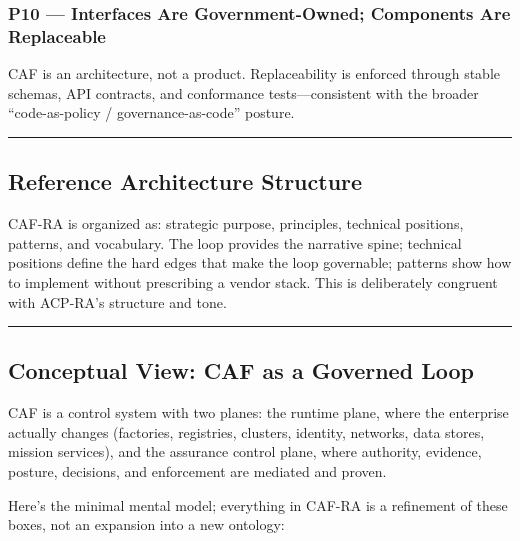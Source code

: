 \documentclass[11pt]{article}
\begin{document}
\hypertarget{p10-interfaces-are-government-owned-components-are-replaceable}{%
\subsubsection{P10 --- Interfaces Are Government-Owned; Components Are Replaceable}\label{p10-interfaces-are-government-owned-components-are-replaceable}}

CAF is an architecture, not a product. Replaceability is enforced
through stable schemas, API contracts, and conformance
tests---consistent with the broader ``code-as-policy /
governance-as-code'' posture. \cite{CodeAsPolicy}

\begin{center}\rule{0.5\linewidth}{0.5pt}\end{center}

\hypertarget{reference-architecture-structure}{%
\subsection{Reference Architecture Structure}\label{reference-architecture-structure}}

CAF-RA is organized as: strategic purpose, principles, technical
positions, patterns, and vocabulary. The loop provides the narrative
spine; technical positions define the hard edges that make the loop
governable; patterns show how to implement without prescribing a vendor
stack. This is deliberately congruent with ACP-RA's structure and tone.
\cite{ACPRA}

\begin{center}\rule{0.5\linewidth}{0.5pt}\end{center}

\hypertarget{conceptual-view-caf-as-a-governed-loop}{%
\subsection{Conceptual View: CAF as a Governed Loop}\label{conceptual-view-caf-as-a-governed-loop}}

CAF is a control system with two planes: the runtime plane, where the enterprise actually changes (factories, registries, clusters, identity, networks, data stores, mission services), and the assurance control plane, where authority, evidence, posture, decisions, and enforcement are mediated and proven.

Here's the minimal mental model; everything in CAF-RA is a refinement of
these boxes, not an expansion into a new ontology:
\end{document}
